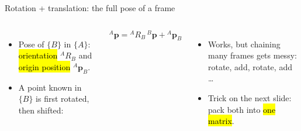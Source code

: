 \documentclass[aspectratio=169,10pt]{beamer}
\newcommand{\triad}[4]{\begin{scope}[shift={(#1,#2)},rotate=#3]
  \draw[ax,mkOrange] (0,0) -- (.7,0) node[right,font=\tiny]{$x_{#4}$};
  \draw[ax,mkMid] (0,0) -- (0,.7) node[above,font=\tiny]{$y_{#4}$};
  \fill[mkNavy] (0,0) circle (.04);\end{scope}}
\begin{document}
\begin{frame}[t]{Rotation + translation: the full pose of a frame}
\begin{columns}[T,onlytextwidth]
\centering
{}
\begin{itemize}\small
\item Pose of $\{B\}$ in $\{A\}$: \hl{orientation} ${}^A\!R_B$ and \hl{origin position} ${}^A\bm p_B$.
\item A point known in $\{B\}$ is first rotated, then shifted:
\end{itemize}
\begin{eqbox}
\vspace{-2mm}
\[
{}^A\bm p={}^A\!R_B\,{}^B\bm p+{}^A\bm p_{B}
\]
\vspace{-4mm}
\end{eqbox}
\begin{itemize}\small
\item Works, but chaining many frames gets messy: rotate, add, rotate, add \ldots
\item Trick on the next slide: pack both into \hl{one matrix}.
\end{itemize}
\end{columns}
\end{frame}
\end{document}
